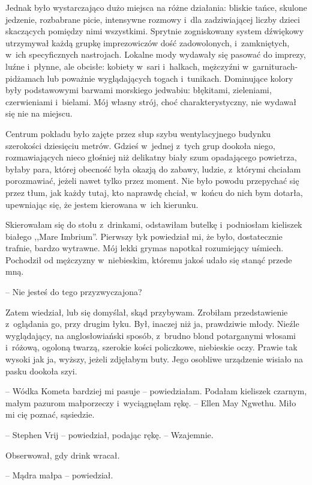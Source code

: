 \documentclass[oneside,polish,11pt,sfheadings]{mwbk}
\begin{document}
Jednak było wystarczająco dużo miejsca na różne działania: bliskie
tańce, skulone jedzenie, rozbabrane picie, intensywne rozmowy i~dla
zadziwiającej liczby dzieci skaczących pomiędzy nimi wszystkimi.
Sprytnie zogniskowany system dźwiękowy utrzymywał każdą grupkę
imprezowiczów dość zadowolonych, i~zamkniętych, w~ich specyficznych
nastrojach. Lokalne mody wydawały się pasować do imprezy, luźne i~płynne, ale obcisłe: kobiety w~sari i~halkach, mężczyźni w~garniturach-pidżamach lub poważnie wyglądających togach i~tunikach.
Dominujące kolory były podstawowymi barwami morskiego jedwabiu:
błękitami, zieleniami, czerwieniami i~bielami. Mój własny strój, choć
charakterystyczny, nie wydawał się nie na miejscu.

Centrum pokładu było zajęte przez słup szybu wentylacyjnego budynku
szerokości dziesięciu metrów. Gdzieś w~jednej z~tych grup dookoła
niego, rozmawiających nieco głośniej niż delikatny biały szum
opadającego powietrza, byłaby para, której obecność była okazją do
zabawy, ludzie, z~którymi chciałam porozmawiać, jeżeli nawet tylko przez
moment. Nie było powodu przepychać się przez tłum, jak każdy tutaj, kto
naprawdę chciał, w~końcu do nich bym dotarła, upewniając się, że jestem
kierowana w~ich kierunku.

Skierowałam się do stołu z~drinkami, odstawiłam butelkę i~podniosłam
kieliszek białego ,,Mare Imbrium''. Pierwszy łyk powiedział mi, że było,
dostatecznie trafnie, bardzo wytrawne. Mój lekki grymas napotkał
rozumiejący uśmiech. Pochodził od mężczyzny w~niebieskim, któremu jakoś
udało się stanąć przede mną.

-- Nie jesteś do tego przyzwyczajona?

Zatem wiedział, lub się domyślał, skąd przybywam. Zrobiłam
przedstawienie z~oglądania go, przy drugim łyku. Był, inaczej niż ja,
prawdziwie młody. Nieźle wyglądający, na anglosłowiański sposób, z~brudno blond potarganymi włosami i~różową, ogoloną twarzą, szerokie
kości policzkowe, niebieskie oczy. Prawie tak wysoki jak ja, wyższy,
jeżeli zdjęłabym buty. Jego osobliwe urządzenie wisiało na pasku dookoła
szyi.

-- Wódka Kometa bardziej mi pasuje -- powiedziałam. Podałam kieliszek
czarnym, małym pazurom małporzeczy i~wyciągnęłam rękę. -- Ellen May
Ngwethu. Miło mi cię poznać, sąsiedzie.

-- Stephen Vrij -- powiedział, podając rękę. -- Wzajemnie.

Obserwował, gdy drink wracał.

-- Mądra małpa -- powiedział.
\end{document}
